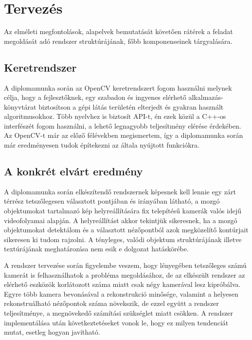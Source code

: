 \chapter{Tervezés}

Az elméleti megfontolások, alapelvek bemutatását követően rátérek a feladat megoldását adó rendszer struktúrájának, főbb komponenseinek tárgyalására.

\section{Keretrendszer}

A diplomamunka során az OpenCV \cite{opencv} keretrendszert fogom használni melynek célja, hogy a fejlesztőknek, egy szabadon és ingyenes elérhető alkalmazás-könyvtárat biztosítson a gépi látás területén elterjedt és gyakran használt algoritmusokhoz. Több nyelvhez is biztosít API-t, én ezek közül a C++-os interfészét fogom használni, a lehető legnagyobb teljesítmény elérése érdekében. Az OpenCV-t már az előző félévekben megismertem, így a diplomamunka során már eredményesen tudok építekezni az általa nyújtott funkciókra.

\section{A konkrét elvárt eredmény}

A diplomamunka során elkészítendő rendszernek képesnek kell lennie egy zárt térrész tetszőlegesen választott pontjában és irányában látható, a mozgó objektumokat tartalmazó kép helyreállítására fix telepítésű kamerák valós idejű videofolyamai alapján. A helyreállítást akkor tekintjük sikeresnek, ha a mozgó objektumokat detektálom és a választott nézőpontból azok megközelítő kontúrjait sikeresen ki tudom rajzolni. A tényleges, valódi objektum struktúrájának illetve textúrájának meghatározása nem esik e dolgozat hatáskörébe.

A rendszer tervezése során figyelembe veszem, hogy lényegében tetszőleges számú kamerát is felhasználhatok a probléma megoldásához, de az elkészült rendszer az elérhető eszközök korlátozott száma miatt csak négy kamerával lesz kipróbálva. Egyre több kamera bevonásával a rekonstrukció minősége, valamint a helyesen rekonstruálható nézőpontok száma növekszik, de ezzel együtt a rendszer teljesítménye, a megnövekedő számítási szükséglet miatt csökken. A rendszer implementálása után következtetéseket vonok le, hogy ez milyen tendenciát mutat, esetleg hogyan javítható. %


